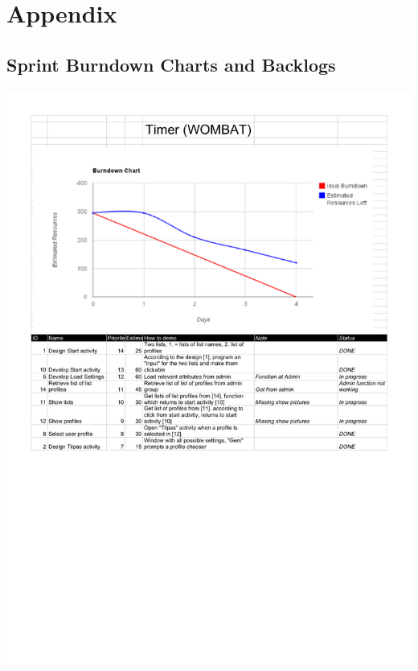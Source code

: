 \chapter*{Appendix}

\section{Sprint Burndown Charts and Backlogs}
\label{sec:burn_back}
	\begin{center}
		\includegraphics[scale=0.5]{Development/burndown_charts/Sprint_1.pdf}

\end{center}
